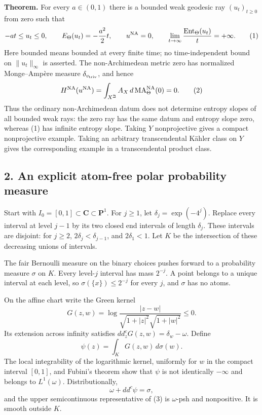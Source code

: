 \documentclass[
]{article}
\begin{document}
\textbf{Theorem.} For every \(a\in(0,1)\) there is a bounded weak
geodesic ray \((u_t)_{t\geq0}\) from zero such that \[
 -at\leq u_t\leq0,\qquad E_\Theta(u_t)=-\frac{a^2}{2}t,
 \qquad u^{\rm NA}=0,
 \qquad \lim_{t\to\infty}\frac{\operatorname{Ent}_\Theta(u_t)}{t}=+\infty.
 \tag{1}
\] Here bounded means bounded at every finite time; no time-independent
bound on \(\|u_t\|_\infty\) is asserted. The non-Archimedean metric zero
has normalized Monge--Ampère measure \(\delta_{v_{\rm triv}}\), and
hence \[
 H^{\rm NA}(u^{\rm NA})=\int_{X^{\beth}} A_X\,d\operatorname{MA}^{\rm NA}_\Theta(0)=0.
 \tag{2}
\] Thus the ordinary non-Archimedean datum does not determine entropy
slopes of all bounded weak rays: the zero ray has the same datum and
entropy slope zero, whereas (1) has infinite entropy slope. Taking \(Y\)
nonprojective gives a compact nonprojective example. Taking an arbitrary
transcendental Kähler class on \(Y\) gives the corresponding example in
a transcendental product class.

\subsection{2. An explicit atom-free polar probability
measure}\label{an-explicit-atom-free-polar-probability-measure}

Start with \(I_0=[0,1]\subset\mathbf C\subset\mathbf P^1\). For
\(j\geq1\), let \(\delta_j=\exp(-4^j)\). Replace every interval at level
\(j-1\) by its two closed end intervals of length \(\delta_j\). These
intervals are disjoint: for \(j\geq2\), \(2\delta_j<\delta_{j-1}\), and
\(2\delta_1<1\). Let \(K\) be the intersection of these decreasing
unions of intervals.

The fair Bernoulli measure on the binary choices pushes forward to a
probability measure \(\sigma\) on \(K\). Every level-\(j\) interval has
mass \(2^{-j}\). A point belongs to a unique interval at each level, so
\(\sigma(\{x\})\leq2^{-j}\) for every \(j\), and \(\sigma\) has no
atoms.

On the affine chart write the Green kernel \[
 G(z,w)=\log\frac{|z-w|}{\sqrt{1+|z|^2}\sqrt{1+|w|^2}}\leq0.
\] Its extension across infinity satisfies
\(dd_z^cG(z,w)=\delta_w-\omega\). Define \[
 \psi(z)=\int_KG(z,w)\,d\sigma(w).
 \tag{3}
\] The local integrability of the logarithmic kernel, uniformly for
\(w\) in the compact interval \([0,1]\), and Fubini's theorem show that
\(\psi\) is not identically \(-\infty\) and belongs to \(L^1(\omega)\).
Distributionally, \[
 \omega+dd^c\psi=\sigma,
\] and the upper semicontinuous representative of (3) is \(\omega\)-psh
and nonpositive. It is smooth outside \(K\).
\end{document}
